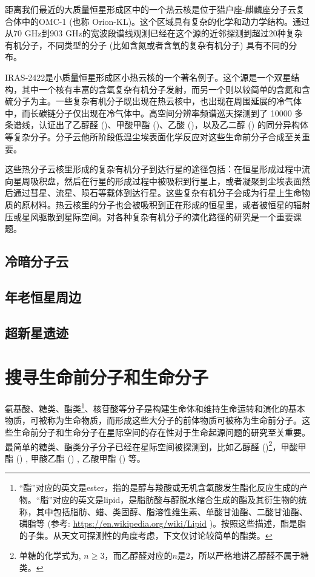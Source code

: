 \documentclass{report}
\newcommand\irassixteen{IRAS\;16293-2422}
\begin{document}
距离我们最近的大质量恒星形成区中的一个热云核是位于猎户座-麒麟座分子云复合体中的OMC-1 (也称 Orion-KL)。这个区域具有复杂的化学和动力学结构。通过从70 GHz到903 GHz的宽波段谱线观测已经在这个源的近邻探测到超过20种复杂有机分子，不同类型的分子 (比如含氮或者含氧的复杂有机分子) 具有不同的分布。

\irassixteen 是小质量恒星形成区小热云核的一个著名例子。这个源是一个双星结构，其中一个核有丰富的含氧复杂有机分子发射，而另一个则以较简单的含氮和含硫分子为主。一些复杂有机分子既出现在热云核中，也出现在周围延展的冷气体中，而长碳链分子仅出现在冷气体中。高空间分辨率频谱巡天探测到了 10000 多条谱线，认证出了乙醇醛 ()、甲酸甲酯 ()、乙酸 ()，以及乙二醇 () 的同分异构体等复杂分子。分子云他所阶段低温尘埃表面化学反应对这些生命前分子合成至关重要。

这些热分子云核里形成的复杂有机分子到达行星的途径包括：在恒星形成过程中流向星周吸积盘，然后在行星的形成过程中被吸积到行星上，或者凝聚到尘埃表面然后通过彗星、流星、陨石等载体到达行星。这些复杂有机分子会成为行星上生命物质的原材料。热云核里的分子也会被吸积到正在形成的恒星里，或者被恒星的辐射压或星风驱散到星际空间。对各种复杂有机分子的演化路径的研究是一个重要课题。

\subsection{冷暗分子云}
\subsection{年老恒星周边}
\subsection{超新星遗迹}

\section{搜寻生命前分子和生命分子}

氨基酸、糖类、酯类\footnote{“酯”对应的英文是ester，指的是醇与羧酸或无机含氧酸发生酯化反应生成的产物。“脂”对应的英文是lipid，是脂肪酸与醇脱水缩合生成的酯及其衍生物的统称，其中包括脂肪、蜡、类固醇、脂溶性维生素、单酸甘油酯、二酸甘油酯、磷脂等 (参考: \url{https://en.wikipedia.org/wiki/Lipid}%
)。按照这些描述，酯是脂的子集。从天文可探测性的角度考虑，下文仅讨论较简单的酯类。}、核苷酸等分子是构建生命体和维持生命运转和演化的基本物质，可被称为生命物质，而形成这些大分子的前体物质可被称为生命前分子。这些生命前分子和生命分子在星际空间的存在性对于生命起源问题的研究至关重要。最简单的糖类、酯类分子分子已经在星际空间被探测到，比如乙醇醛 ()\footnote{单糖的化学式为, $n\ge3$，而乙醇醛对应的$n$是2，所以严格地讲乙醇醛不属于糖类。}\citep{Hollis2000,Jorgensen2012}，甲酸甲酯 () \citep{Sakai2006}, 甲酸乙酯 () \citep{Belloche2009}, 乙酸甲酯 () \citep{Tercero2013} 等。
\end{document}

